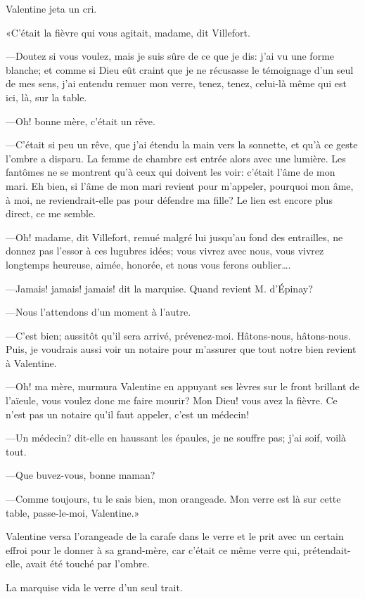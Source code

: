 Valentine jeta un cri. 

«C'était la fièvre qui vous agitait, madame, dit Villefort. 

—Doutez si vous voulez, mais je suis sûre de ce que je dis: j'ai vu une forme blanche; et comme si Dieu eût craint que je ne récusasse le témoignage d'un seul de mes sens, j'ai entendu remuer mon verre, tenez, tenez, celui-là même qui est ici, là, sur la table. 

—Oh! bonne mère, c'était un rêve. 

—C'était si peu un rêve, que j'ai étendu la main vers la sonnette, et qu'à ce geste l'ombre a disparu. La femme de chambre est entrée alors avec une lumière. Les fantômes ne se montrent qu'à ceux qui doivent les voir: c'était l'âme de mon mari. Eh bien, si l'âme de mon mari revient pour m'appeler, pourquoi mon âme, à moi, ne reviendrait-elle pas pour défendre ma fille? Le lien est encore plus direct, ce me semble. 

—Oh! madame, dit Villefort, remué malgré lui jusqu'au fond des entrailles, ne donnez pas l'essor à ces lugubres idées; vous vivrez avec nous, vous vivrez longtemps heureuse, aimée, honorée, et nous vous ferons oublier\dots. 

—Jamais! jamais! jamais! dit la marquise. Quand revient M. d'Épinay? 

—Nous l'attendons d'un moment à l'autre. 

—C'est bien; aussitôt qu'il sera arrivé, prévenez-moi. Hâtons-nous, hâtons-nous. Puis, je voudrais aussi voir un notaire pour m'assurer que tout notre bien revient à Valentine. 

—Oh! ma mère, murmura Valentine en appuyant ses lèvres sur le front brillant de l'aïeule, vous voulez donc me faire mourir? Mon Dieu! vous avez la fièvre. Ce n'est pas un notaire qu'il faut appeler, c'est un médecin! 

—Un médecin? dit-elle en haussant les épaules, je ne souffre pas; j'ai soif, voilà tout. 

—Que buvez-vous, bonne maman? 

—Comme toujours, tu le sais bien, mon orangeade. Mon verre est là sur cette table, passe-le-moi, Valentine.» 

Valentine versa l'orangeade de la carafe dans le verre et le prit avec un certain effroi pour le donner à sa grand-mère, car c'était ce même verre qui, prétendait-elle, avait été touché par l'ombre. 

La marquise vida le verre d'un seul trait. 

